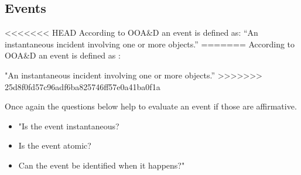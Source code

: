 \subsection{Events}

<<<<<<< HEAD
According to OOA\&D an event is defined as\citep[p.~53]{Rod-Aalborg}:
``An instantaneous incident involving one or more objects.''
=======
According to OOA\&D an event is defined as \citep[p.~53]{Rod-Aalborg}:

"An instantaneous incident involving one or more objects.''
>>>>>>> 25d8f0fd57c96adf6ba825746ff57e0a41ba0f1a

Once again the questions below help to evaluate an event if those are affirmative\citep[p.~65]{Rod-Aalborg}.
\begin{itemize}
	\item "Is the event instantaneous?
	\item Is the event atomic?
	\item Can the event be identified when it happens?"
\end{itemize}

